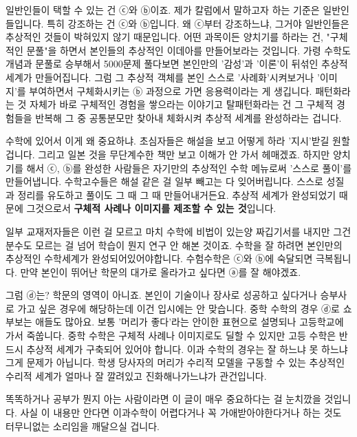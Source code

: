 일반인들이 택할 수 있는 건 ⓒ와 ⓑ이죠.
제가 칼럼에서 말하고자 하는 기준은 일반인들입니다. 특히 강조하는 건 ⓒ와 ⓑ입니다.
왜 ⓒ부터 강조하느냐, 그거야 일반인들은 추상적인 것들이 박혀있지 않기 때문입니다.
어떤 과목이든 양치기를 하라는 건, "구체적인 문풀"을 하면서 본인들의 추상적인 이데아를 만들어보라는 것입니다.
가령 수학도 개념과 문풀로 승부해서 5000문제 풀다보면 본인만의 '감성'과 '이론'이 뒤섞인 추상적 세계가 만들어집니다.
그럼 그 추상적 객체를 본인 스스로 '사례화'시켜보거나 '이미지'를 부여하면서 구체화시키는 ⓑ 과정으로 가면 응용력이라는 게 생깁니다.
패턴화라는 것 자체가 바로 구체적인 경험을 쌓으라는 이야기고
탈패턴화라는 건 그 구체적 경험들을 반복해 그 중 공통분모만 찾아내 체화시켜 추상적 세계를 완성하라는 겁니다.
\vspace{5mm}

수학에 있어서 이게 왜 중요하냐.
초심자들은 해설을 보고 어떻게 하라 '지시'받길 원할 겁니다. 그리고 일본 것을 무단계수한 책만 보고 이해가 안 가서 헤매겠죠.
하지만 양치기를 해서 ⓒ, ⓑ를 완성한 사람들은 자기만의 추상적인 수학 메뉴로써 '스스로 풀이'를 만들어냅니다.
수학고수들은 해설 같은 걸 일부 빼고는 다 잊어버립니다. 스스로 성질과 정리를 유도하고 풀이도 그 때 그 때 만들어내거든요.
추상적 세계가 완성되었기 때문에 그것으로서 \textbf{구체적 사례나 이미지를 제조할 수 있는 것}입니다.
\vspace{5mm}

일부 교재저자들은 이런 걸 모르고 마치 수학에 비법이 있는양 짜깁기서를 내지만 그건 분수도 모르는 걸 넘어 학습이 뭔지 연구 안 해본 것이죠.
수학을 잘 하려면 본인만의 추상적인 수학세계가 완성되어있어야합니다.
수험수학은 ⓒ와 ⓑ에 숙달되면 극복됩니다.
만약 본인이 뛰어난 학문의 대가로 올라가고 싶다면 ⓐ를 잘 해야겠죠.
\vspace{5mm}

그럼 ⓓ는? 학문의 영역이 아니죠.
본인이 기술이나 장사로 성공하고 싶다거나 승부사로 가고 싶은 경우에 해당하는데 이건 입시에는 안 맞습니다.
중학 수학의 경우 ⓓ로 쇼부보는 애들도 많아요. 보통 '머리가 좋다'라는 안이한 표현으로 설명되나 고등학교에 가서 죽쑵니다.
중학 수학은 구체적 사례나 이미지로도 딜할 수 있지만 고등 수학은 반드시 추상적 세계가 구축되어 있어야 합니다.
이과 수학의 경우는 잘 하느냐 못 하느냐 그게 문제가 아닙니다.
학생 당사자의 머리가 수리적 모델을 구동할 수 있는 추상적인 수리적 세계가 얼마나 잘 깔려있고 진화해나가느냐가 관건입니다.
\vspace{5mm}

똑똑하거나 공부가 뭔지 아는 사람이라면 이 글이 매우 중요하다는 걸 눈치깠을 것입니다.
사실 이 내용만 안다면 이과수학이 어렵다거나 꼭 가애받아야한다거나 하는 것도 터무니없는 소리임을 깨달으실 겁니다.
\vspace{5mm}

